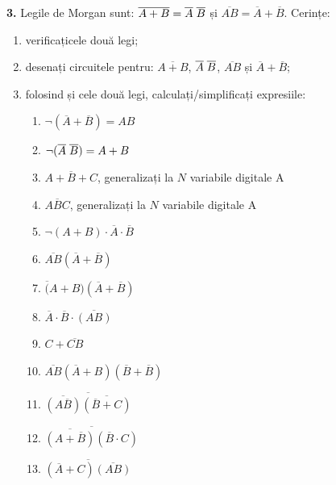 \documentclass[a4paper]{article}
\begin{document}
\textbf{3.}
Legile de Morgan sunt: $\overline{A+B}=\overline{A}\hspace{0.1cm}\overline{B}$ și $\overline{AB}=\overline{A}+\overline{B}$. Cerințe:
\begin{enumerate}[label=(\alph*)]
    \item verificațicele două legi;
    \item desenați circuitele pentru: $\overline{A+B}$, $\overline{A}\hspace{0.1cm}\overline{B}$, $\overline{AB}$ și $\overline{A}+\overline{B}$;
    \item folosind și cele două legi, calculați/simplificați expresiile:
    \begin{enumerate}[label=i.*]
        \item $\neg(\overline{A}+\overline{B}) = AB$
        \item $\neg(\overline{A}\hspace{0.1cm}\overline{B}) = A + B$
        \item $\overline{A+B+C}$, generalizați la $N$ variabile digitale A
        \item $\overline{ABC}$, generalizați la $N$ variabile digitale A
        \item $\neg(A + B) \cdot \overline{A} \cdot \overline{B}$
        \item $\overline{AB}(\overline{A} + \overline{B})$
        \item ${\overline(A + B)}(\overline{A}+\overline{B})$
        \item $\overline{A} \cdot \overline{B} \cdot \overline{(AB)}$
        \item $C + \overline{CB}$
        \item $\overline{AB}(\overline{A} + B)(\overline{B} + \overline{B})$
        \item $\overline{\overline{(A\overline{B})}\overline{(\overline{B} + C)}}$
        \item $\overline{\overline{(A + \overline{B})}(\overline{B} \cdot C)}$
        \item $\overline{(\overline{A} + C)\overline{(AB)}}$
    \end{enumerate}
\end{enumerate}
\end{document}
